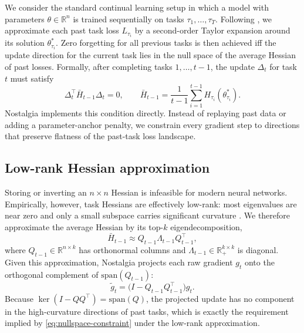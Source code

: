 We consider the standard continual learning setup in which a model with parameters $\theta \in \mathbb{R}^n$ is trained sequentially on tasks $\tau_1, \dots, \tau_T$. Following \cite{lanzillotta2024local}, we approximate each past task loss $L_{\tau_i}$ by a second-order Taylor expansion around its solution $\theta_{\tau_i}^*$. Zero forgetting for all previous tasks is then achieved iff the update direction for the current task lies in the null space of the average Hessian of past losses. Formally, after completing tasks $1, \dots, t-1$, the update $\Delta_t$ for task $t$ must satisfy
\begin{equation}
\Delta_t^\top \bar{H}_{t-1} \Delta_t = 0,
\qquad
\bar{H}_{t-1} = \frac{1}{t-1}\sum_{i=1}^{t-1} H_{\tau_i}(\theta_{\tau_i}^*).
\label{eq:nullspace-constraint}
\end{equation}
Nostalgia implements this condition directly. Instead of replaying past data or adding a parameter-anchor penalty, we constrain every gradient step to directions that preserve flatness of the past-task loss landscape.

\subsection{Low-rank Hessian approximation}

Storing or inverting an $n \times n$ Hessian is infeasible for modern neural networks. Empirically, however, task Hessians are effectively low-rank: most eigenvalues are near zero and only a small subspace carries significant curvature \cite{sagun2017eigenvalueshessiandeeplearning, Papyan2019MeasurementsOT, pmlr-v97-ghorbani19b, li2024hessian}. We therefore approximate the average Hessian by its top-$k$ eigendecomposition,
\begin{equation}
\bar{H}_{t-1} \approx Q_{t-1} \Lambda_{t-1} Q_{t-1}^\top,
\end{equation}
where $Q_{t-1} \in \mathbb{R}^{n \times k}$ has orthonormal columns and $\Lambda_{t-1} \in \mathbb{R}^{k \times k}_+$ is diagonal. Given this approximation, Nostalgia projects each raw gradient $g_t$ onto the orthogonal complement of $\mathrm{span}(Q_{t-1})$:
\begin{equation}
\tilde{g}_t = \bigl(I - Q_{t-1}^{}Q_{t-1}^{\top}\bigr) g_t.
\label{eq:projection}
\end{equation}
Because $\ker(I - QQ^\top) = \mathrm{span}(Q)$, the projected update has no component in the high-curvature directions of past tasks, which is exactly the requirement implied by \eqref{eq:nullspace-constraint} under the low-rank approximation.

